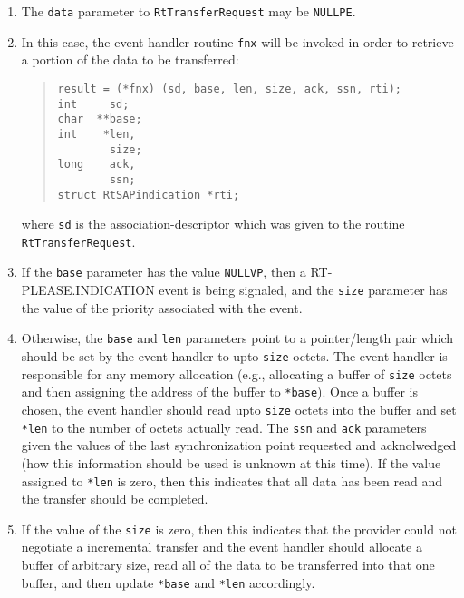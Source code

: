 \begin{enumerate}
\item	The \verb"data" parameter to \verb"RtTransferRequest" may be
	\verb"NULLPE".

\item	In this case, the event-handler routine \verb"fnx" will be invoked
	in order to retrieve a portion of the data to be transferred:
\begin{quote}\small\begin{verbatim}
result = (*fnx) (sd, base, len, size, ack, ssn, rti);
int     sd;
char  **base;
int    *len,
        size;
long    ack,
        ssn;
struct RtSAPindication *rti;
\end{verbatim}
\end{quote}
where \verb"sd" is the association-descriptor which was given to the routine
\verb"RtTransferRequest".

\item	If the \verb"base" parameter has the value \verb"NULLVP",
	then a {\sf RT-PLEASE.IN\-DI\-CA\-TION\/} event is being signaled,
	and the \verb"size" parameter has the value of the priority associated
	with the event.

\item	Otherwise, the \verb"base" and \verb"len" parameters point to a
	pointer/length pair which should be set by the event handler to upto
	\verb"size" octets.  The event handler is responsible for any
	memory allocation (e.g., allocating a buffer of \verb"size" octets and
	then assigning the address of the buffer to \verb"*base").
	Once a buffer is chosen, the event handler should read upto
	\verb"size" octets into the buffer and set \verb"*len" to the number
	of octets actually read.  The \verb"ssn" and \verb"ack" parameters
	given the values of the last synchronization point requested and
	acknolwedged (how this information should be used is unknown at this
	time).  If the value assigned to \verb"*len" is zero, then this
	indicates that all data has been read and the transfer should be
	completed.

\item	If the value of the \verb"size" is zero, then this indicates that the
	provider could not negotiate a incremental transfer and the event
	handler should allocate a buffer of arbitrary size, read all of the
	data to be transferred into that one buffer, and then update
	\verb"*base" and \verb"*len" accordingly.


\end{enumerate}
